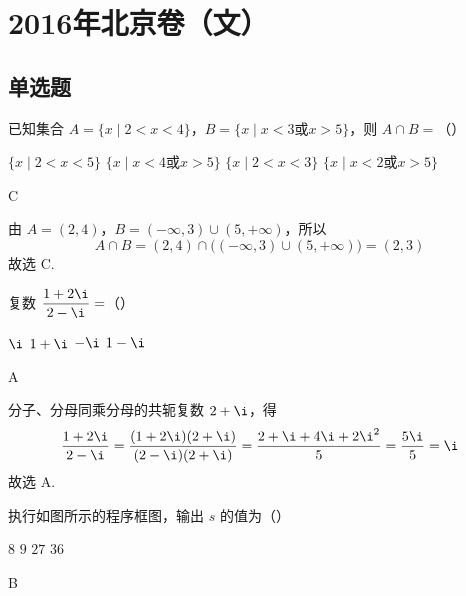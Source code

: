 
\chapter{2016年北京卷（文）}

\section{单选题}

\begin{problem}
已知集合 \(A=\{x\mid 2<x<4\}\)，\(B=\{x\mid x<3 \text{或} x>5\}\)，则 \(A\cap B=\)（\quad）

\choices
    {\(\{x\mid 2<x<5\}\)}
    {\(\{x\mid x<4 \text{或} x>5\}\)}
    {\(\{x\mid 2<x<3\}\)}
    {\(\{x\mid x<2 \text{或} x>5\}\)}
\end{problem}

\begin{answer}
C
\end{answer}

\begin{solution}
由 \(A=(2,4)\)，\(B=(-\infty,3)\cup(5,+\infty)\)，所以
\[
A\cap B=(2,4)\cap\bigl((-\infty,3)\cup(5,+\infty)\bigr)=(2,3)
\]
故选 C.
\end{solution}

\begin{problem}
复数 \(\dfrac{1+2\i}{2-\i}=\)（\quad）

\choices
    {\(\i\)}
    {\(1+\i\)}
    {\(-\i\)}
    {\(1-\i\)}
\end{problem}

\begin{answer}
A
\end{answer}

\begin{solution}
分子、分母同乘分母的共轭复数 \(2+\i\)，得
\[
\frac{1+2\i}{2-\i}=\frac{(1+2\i)(2+\i)}{(2-\i)(2+\i)}=\frac{2+\i+4\i+2\i^2}{5}=\frac{5\i}{5}=\i
\]
故选 A.
\end{solution}

\begin{problem}
执行如图所示的程序框图，输出 \(s\) 的值为（\quad）


\choices
    {\(8\)}
    {\(9\)}
    {\(27\)}
    {\(36\)}
\end{problem}

\begin{answer}
B
\end{answer}

